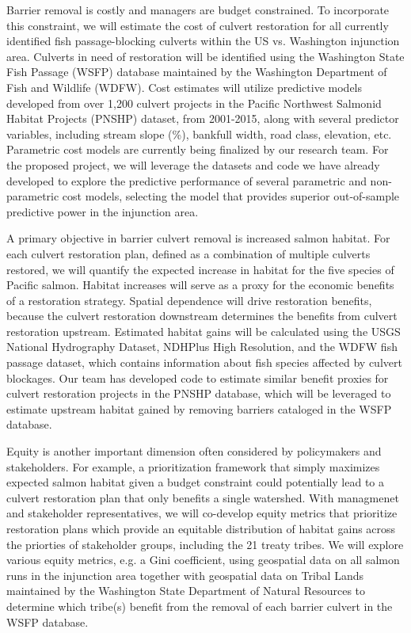 \documentclass[12pt]{elsarticle}
\begin{document}
Barrier removal is costly and managers are budget constrained. To incorporate this constraint, we will estimate the cost of culvert restoration for all currently identified fish passage-blocking culverts within the US vs. Washington injunction area. Culverts in need of restoration will be identified using the Washington State Fish Passage (WSFP) database maintained by the Washington Department of Fish and Wildlife (WDFW). Cost estimates will utilize predictive models developed from over 1,200 culvert projects in the Pacific Northwest Salmonid Habitat Projects (PNSHP) dataset, from 2001-2015, along with several predictor variables, including stream slope (\%), bankfull width, road class, elevation, etc. Parametric cost models are currently being finalized by our research team. For the proposed project, we will leverage the datasets and code we have already developed to explore the predictive performance of several parametric and non-parametric cost models, selecting the model that provides superior out-of-sample predictive power in the injunction area.

A primary objective in barrier culvert removal is increased salmon habitat. For each culvert restoration plan, defined as a combination of multiple culverts restored, we will quantify the expected increase in habitat for the five species of Pacific salmon. Habitat increases will serve as a proxy for the economic benefits of a restoration strategy. Spatial dependence will drive restoration benefits, because the culvert restoration downstream determines the benefits from culvert restoration upstream. Estimated habitat gains will be calculated using the USGS National Hydrography Dataset, NDHPlus High Resolution, and the WDFW fish passage dataset, which contains information about fish species affected by culvert blockages. Our team has developed code to estimate similar benefit proxies for culvert restoration projects in the PNSHP database, which will be leveraged to estimate upstream habitat gained by removing barriers cataloged in the WSFP database. 

%
Equity is another important dimension often considered by policymakers and stakeholders. For example, a prioritization framework that simply maximizes expected salmon habitat given a budget constraint could potentially lead to a culvert restoration plan that only benefits a single watershed. With managmenet and stakeholder representatives, we will co-develop equity metrics that prioritize restoration plans which provide an equitable distribution of habitat gains across the priorties of stakeholder groups, including the 21 treaty tribes. We will explore various equity metrics, e.g. a Gini coefficient, using geospatial data on all salmon runs in the injunction area together with geospatial data on Tribal Lands maintained by the Washington State Department of Natural Resources to determine which tribe(s) benefit from the removal of each barrier culvert in the WSFP database. 
\end{document}
